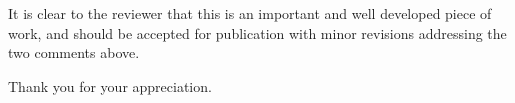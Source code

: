 \begin{reviewer}
It is clear to the reviewer that this is an important and well developed
piece of work, and should be accepted for publication with minor revisions
addressing the two comments above.
\end{reviewer}

\begin{authors}
  Thank you for your appreciation.
\end{authors}
